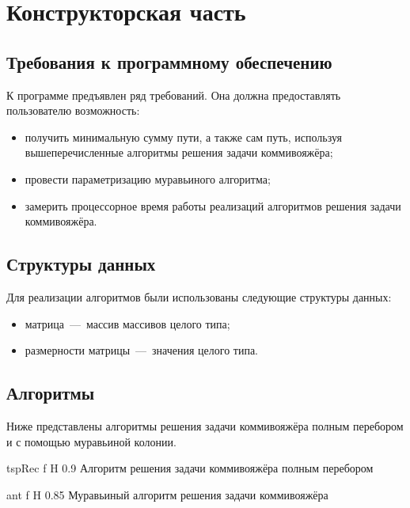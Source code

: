 \chapter{Конструкторская часть}

\section{Требования к программному обеспечению}
К программе предъявлен ряд требований. Она должна предоставлять пользователю возможность:
\begin{itemize}[label=---]
	\item получить минимальную сумму пути, а также сам путь, используя вышеперечисленные алгоритмы решения задачи коммивояжёра;
	\item провести параметризацию муравьиного алгоритма;
	\item замерить процессорное время работы реализаций алгоритмов решения задачи коммивояжёра.
\end{itemize}


\section{Структуры данных}

Для реализации алгоритмов были использованы следующие структуры данных:
\begin{itemize}[label=---]
	\item матрица~---~массив массивов целого типа;
	\item размерности матрицы~---~значения целого типа.
\end{itemize}

\section{Алгоритмы}

Ниже представлены алгоритмы решения задачи коммивояжёра полным перебором и с помощью муравьиной колонии.

{tspRec}
{f}
{H}
{0.9\textwidth}
{Алгоритм решения задачи коммивояжёра полным перебором}

{ant}
{f}
{H}
{0.85\textwidth}
{Муравьиный алгоритм решения задачи коммивояжёра}
